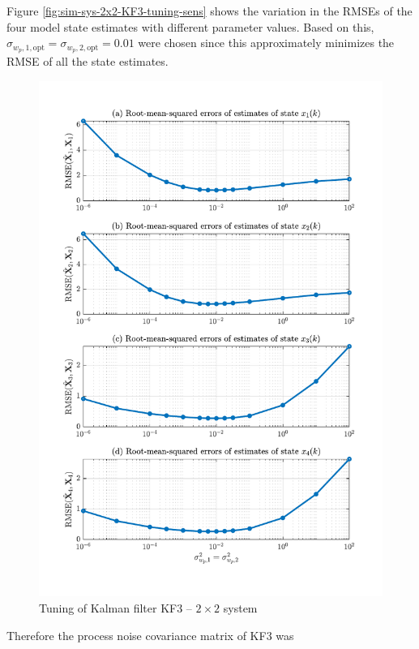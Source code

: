Figure \ref{fig:sim-sys-2x2-KF3-tuning-sens} shows the variation in the \gls{RMSE}s of the four model state estimates with different parameter values. Based on this, $\sigma_{w_p,1,\text{opt}}=\sigma_{w_p,2,\text{opt}}=0.01$ were chosen since this approximately minimizes the \gls{RMSE} of all the state estimates.
\begin{figure}[htp]
	\centering
	\includegraphics[width=14cm]{images/rod_obs_sim3_3KF_Q_seed_6.pdf}
	\caption{Tuning of Kalman filter KF3 – $2\times2$ system}
	\label{fig:sim-sys-2x2-KF3-tuning}
\end{figure}
Therefore the process noise covariance matrix of KF3 was
